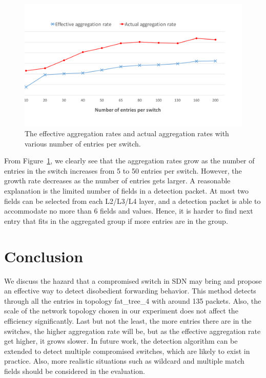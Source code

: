 \documentclass[conference]{IEEEtran}
\begin{document}
\begin{figure}[ht]
\centering
\includegraphics[width=1\linewidth]{figures/exp_entrynum_trend.pdf}
\caption{The effective aggregation rates and actual aggregation rates with various number of entries per switch.}
\label{exp_entrynum_trend}
\end{figure}

From Figure~\ref{exp_entrynum_trend}, we clearly see that the aggregation rates grow as the number of entries in the switch increases from 5 to 50 entries per switch. However, the growth rate decreases as the number of entries gets larger. A reasonable explanation is the limited number of fields in a detection packet. At most two fields can be selected from each L2/L3/L4 layer, and a detection packet is able to accommodate no more than 6 fields and values. Hence, it is harder to find next entry that fits in the aggregated group if more entries are in the group.

\section{Conclusion}
\label{conclusion}
We discuss the hazard that a compromised switch in SDN may bring and propose an effective way to detect disobedient forwarding behavior. This method detects through all the entries in topology fat\_tree\_4 with around 135 packets. Also, the scale of the network topology chosen in our experiment does not affect the efficiency significantly. Last but not the least, the more entries there are in the switches, the higher aggregation rate will be, but as the effective aggregation rate get higher, it grows slower. In future work, the detection algorithm can be extended to detect multiple compromised switches, which are likely to exist in practice. Also, more realistic situations such as wildcard and multiple match fields should be considered in the evaluation.
\end{document}
